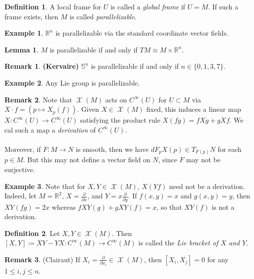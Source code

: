 \documentclass[10pt,letterpaper,cm]{nupset}
\theoremstyle{definition}
\newtheorem*{definition}{Definition}
\newtheorem{exmp}{Example}
\newtheorem{remark}{Remark}
\newtheorem{lemma}{Lemma}
\newcommand{\R}{\mathbb R}
\renewcommand{\S}{\mathbb S}
\newcommand{\1}{\mathbf{1}}
\newcommand{\0}{\vec 0}
\DeclareMathOperator{\vf}{\mathscr{X}}
\begin{document}
\begin{definition}
A  local frame for $U$ is called a \textit{global frame} if $U =M$. If such a frame exists, then $M$ is called \textit{parallelizable}.
\end{definition}

\begin{exmp}
$\R^n$ is parallelizable via the standard coordinate vector fields.
\end{exmp}

\begin{lemma}
$M$ is parallelizable if and only if $TM \approx M \times \R^n$.
\end{lemma}

\begin{remark}{\textbf{(Kervaire)}}
$\S^n$ is parallelizable if and only if $n\in \{0, 1, 3, 7\}$.
\end{remark}

\begin{exmp}
Any Lie group is parallelizable. 
\end{exmp}

\begin{remark}
Note that $\vf(M)$ acts on $C^{\infty}(U)$ for $U \subset M$ via $X \cdot f = (p \mapsto X_p(f))$. Given $X \in \vf(M)$ fixed, this induces a linear map $X : C^{\infty}(U) \to C^{\infty}(U)$ satisfying the product rule $X(fg) = fXg  + gXf$. We cal such a map a \textit{derivation} of $C^{\infty}(U)$.
\\ \\ Moreover, if $F: M \to N$ is smooth, then we have $dF_pX(p) \in T_{F(p)}N$ for each $p \in M$. But this may not define a vector field on $N$, since $F$ may not be surjective.
\end{remark}

\begin{exmp}
Note that for $X, Y \in \vf(M)$, $X(Yf)$ need not be a derivation. Indeed, let $M= \R^2$, $X= \frac{\partial}{\partial{x}}$, and $Y = x \frac{\partial}{\partial{y}}$. If $f(x,y)=x$ and $g(x, y) = y$, then $XY(fg) = 2x$ whereas $fXY(g) + gXY(f) = x$, so that $XY(f)$ is not a derivation.
\end{exmp}

\begin{definition}
Let $X, Y \in \vf(M)$. Then $[X, Y] \coloneqq  XY - YX : C^{\infty}(M)\to C^{\infty}(M)$ is called the \textit{Lie bracket of $X$ and $Y$}.
\end{definition}

\begin{remark} {(Clairaut)}
If $X_i = \frac{\partial}{\partial{x_i}}\in \vf(M)$, then $[X_i, X_j] = 0$ for any $1\leq i,j \leq n$.
\end{remark}
\end{document}
